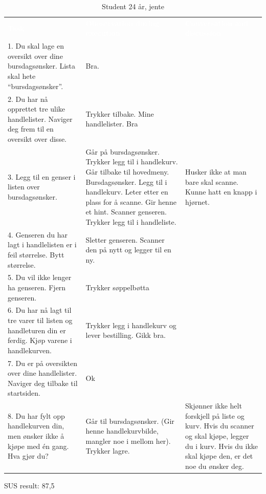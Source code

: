 \begin{table}[H]
    \caption{Student 24 år, jente}
    \label{tab:observasjon1_2}
    \centering
    \begin{tabular}{L{15em}  L{15em} L{15em}}
        \textbf{\textcolor{white}{Task}} & \textbf{\textcolor{white}{Obeservation during execution}} & \textbf{\textcolor{white}{Conversation and discussion}}\\
        1. Du skal lage en oversikt over dine bursdagsønsker. Lista skal hete “bursdagsønsker”. & Bra. & \\
        2. Du har nå opprettet tre ulike handlelister. Naviger deg frem til en oversikt over disse. & Trykker tilbake. Mine handlelister. Bra &  \\
        3. Legg til en genser i listen over bursdagsønsker. & Går på bursdagsønsker. Trykker legg til i handlekurv. Går tilbake til hovedmeny. Bursdagsønsker. Legg til i handlekurv. Leter etter en plass for å scanne. Gir henne et hint. Scanner genseren. Trykker legg til i handleliste. & Husker ikke at man bare skal scanne. Kunne hatt en knapp i hjørnet.\\
        4. Genseren du har lagt i handlelisten er i feil størrelse. Bytt størrelse. & Sletter genseren. Scanner den på nytt og legger til en ny. & \\
        5. Du vil ikke lenger ha genseren. Fjern genseren. & Trykker søppelbøtta & \\
        6. Du har nå lagt til tre varer til listen og handleturen din er ferdig. Kjøp varene i handlekurven. & Trykker legg i handlekurv og lever bestilling. Gikk bra. & \\
        7. Du er på oversikten over dine handlelister. Naviger deg tilbake til startsiden. & Ok & \\
        8. Du har fylt opp handlekurven din, men ønsker ikke å kjøpe med én gang. Hva gjør du? & Går til bursdagsønsker. (Gir henne handlekurvbilde, mangler noe i mellom her). Trykker lagre. & Skjønner ikke helt forskjell på liste og kurv. Hvis du scanner og skal kjøpe, legger du i kurv. Hvis du ikke skal kjøpe den, er det noe du ønsker deg.\\
    \end{tabular}
\end{table}

\noindent SUS result: 87,5

